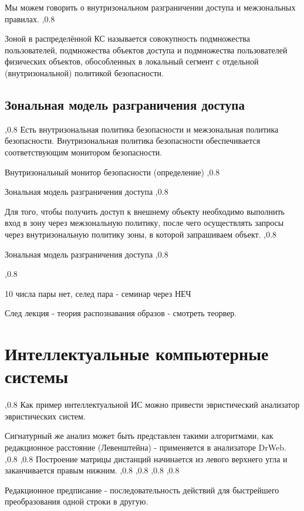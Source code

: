 \documentclass[a4paper,12pt]{report}
\begin{document}
	Мы можем говорить о внутризональном разграничении доступа и межзональных правилах.
	,0.8

	 Зоной в распределённой КС называется совокупность подмножества пользователей, подмножества объектов доступа и подмножества пользователей физических объектов, обособленных в локальный сегмент с отдельной (внутризональной) политикой безопасности.

	\subsection{Зональная модель разграничения доступа}
	,0.8
	Есть внутризональная политика безопасности и межзональная политика безопасности. Внутризональная политика безопасности обеспечивается соответствующим монитором безопасности.

	Внутризональный монитор безопасности (определение)
	,0.8

	Зональная модель разграничения доступа
	,0.8

	Для того, чтобы получить доступ к внешнему объекту необходимо выполнить вход в зону через межзональную политику, после чего осуществлять запросы через внутризональную политику зоны, в которой запрашиваем объект.
	,0.8

	Зональная модель разграничения доступа
	,0.8

	,0.8

	10 числа пары нет, селед пара - семинар через НЕЧ

	След лекция - теория распознавания образов - смотреть теорвер.


	\section{Интеллектуальные компьютерные системы}
	,0.8
	Как пример интеллектуальной ИС можно привести эвристический анализатор эвристических систем.

	Сигнатурный же анализ может быть представлен такими алгоритмами, как редакционное расстояние (Левенштейна) - применяется в анализаторе DrWeb.
	,0.8
	,0.8
	Построение матрицы дистанций начинается из левого верхнего угла и заканчивается правым нижним.
	,0.8
	,0.8
	,0.8
	,0.8

	Редакционное предписание - последовательность действий для быстрейшего преобразования одной строки в другую.
\end{document}
